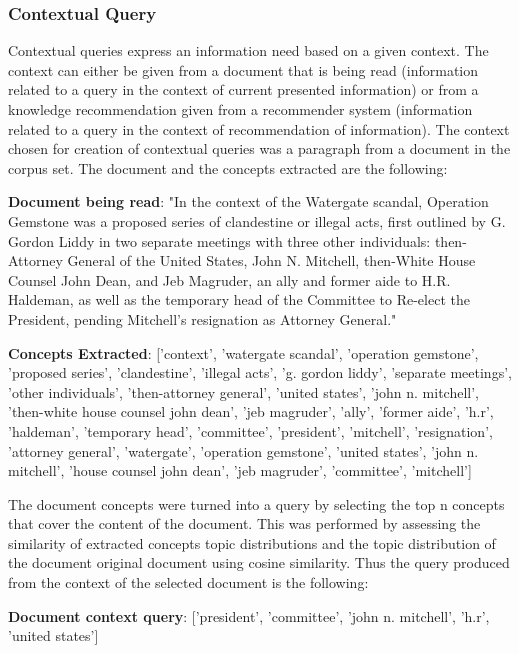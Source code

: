 \subsubsection{Contextual Query}
Contextual queries express an information need based on a given context. The context can either be given from a document that is being read (information related to a query in the context of current presented information) or from a knowledge recommendation given from a recommender system (information related to a query in the context of recommendation of information). The context chosen for creation of contextual queries was a paragraph from a document in the corpus set. The document and the concepts extracted are the following:

\textbf{Document being read}: "In the context of the Watergate scandal, Operation Gemstone was a proposed series of clandestine or illegal acts, first outlined by G. Gordon Liddy in two separate meetings with three other individuals: then-Attorney General of the United States, John N. Mitchell, then-White House Counsel John Dean, and Jeb Magruder, an ally and former aide to H.R. Haldeman, as well as the temporary head of the Committee to Re-elect the President, pending Mitchell's resignation as Attorney General."

\textbf{Concepts Extracted}: ['context', 'watergate scandal', 'operation gemstone', 'proposed series', 'clandestine', 'illegal acts', 'g. gordon liddy', 'separate meetings', 'other individuals', 'then-attorney general', 'united states', 'john n. mitchell', 'then-white house counsel john dean', 'jeb magruder', 'ally', 'former aide', 'h.r', 'haldeman', 'temporary head', 'committee', 'president', 'mitchell', 'resignation', 'attorney general', 'watergate', 'operation gemstone', 'united states', 'john n. mitchell', 'house counsel john dean', 'jeb magruder', 'committee', 'mitchell']

The document concepts were turned into a query by selecting the top n concepts that cover the content of the document. This was performed by assessing the similarity of extracted concepts topic distributions and the topic distribution of the document original document using cosine similarity. Thus the query produced from the context of the selected document is the following:

\textbf{Document context query}: ['president', 'committee', 'john n. mitchell', 'h.r', 'united states']


